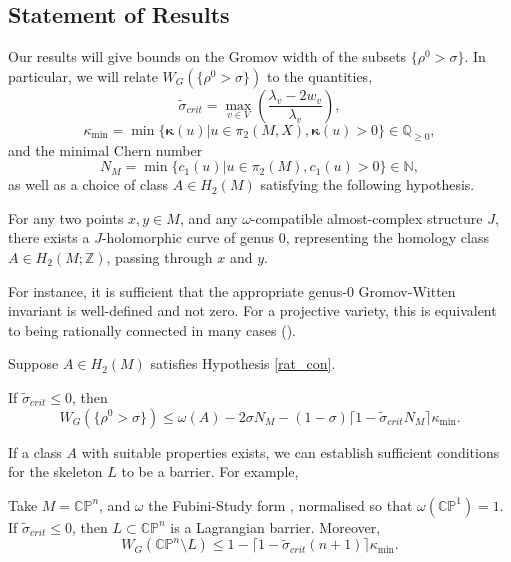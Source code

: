\documentclass{article}
\numberwithin{equation}{section}
\numberwithin{figure}{section}
\begin{document}
\subsection{Statement of Results}
Our results will give bounds on the Gromov width of the subsets $\{\rho^0> \sigma\}$. In particular, we will relate $W_G(\{\rho^0> \sigma\})$ to the quantities,
\begin{equation}
    \tilde{\sigma}_{crit}=\max_{v\in V}\left(\frac{\lambda_v-2w_v}{\lambda_v}\right),
    \label{sigma_crit}
\end{equation} 
\begin{equation}
\label{lambda_min}
\kappa_{\min}=\min\{\pmb{\kappa}(u)| u\in \pi_2(M,X), \pmb{\kappa}(u)>0\}\in\mathbb{Q}_{\geq 0},  
\end{equation}
and the minimal Chern number
\begin{equation}
    N_M=\min\{c_1(u)|u\in\pi_2(M), c_1(u)>0\}\in\mathbb{N},
\end{equation}
as well as a choice of class $A\in H_2(M)$ satisfying the following hypothesis.
\begin{hyp}
\label{rat_con}
    For any two points $x,y\in M$, and any $\omega$-compatible almost-complex structure $J$, there exists a $J$-holomorphic curve of genus $0$, representing the homology class $A\in H_2(M;\mathbb{Z})$, passing through $x$ and $y$.
\end{hyp}
For instance, it is sufficient that the appropriate genus-$0$ Gromov-Witten invariant is well-defined and not zero. For a projective variety, this is equivalent to being rationally connected in many cases (\cite{Tian_2012}).

\begin{thmn}[\ref{T:1}]
Suppose $A\in H_2(M)$ satisfies Hypothesis \ref{rat_con}. 

If $\tilde{\sigma}_{crit}\leq 0$, then
\begin{equation}
W_G(\{\rho^0> \sigma\})\leq \omega(A)-2\sigma N_M -(1-\sigma)\lceil1-\tilde{\sigma}_{crit}N_M\rceil\kappa_{\min}.
\end{equation}
\end{thmn}
If a class $A$ with suitable properties exists, we can establish sufficient conditions for the skeleton $L$ to be a barrier. For example,
\begin{thmn}[\ref{T:2}]
    Take $M=\mathbb{CP}^n$, and $\omega$ the Fubini-Study form , normalised so that $\omega(\mathbb{CP}^1)=1$. If $\tilde{\sigma}_{crit}\leq 0$, then $L\subset \mathbb{CP}^n$ is a Lagrangian barrier. Moreover,
    \begin{equation}
        W_G(\mathbb{CP}^n\setminus L)\leq 1-\lceil 1-\tilde{\sigma}_{crit}(n+1)\rceil \kappa_{\min}.
    \end{equation}
\end{thmn}
\end{document}
